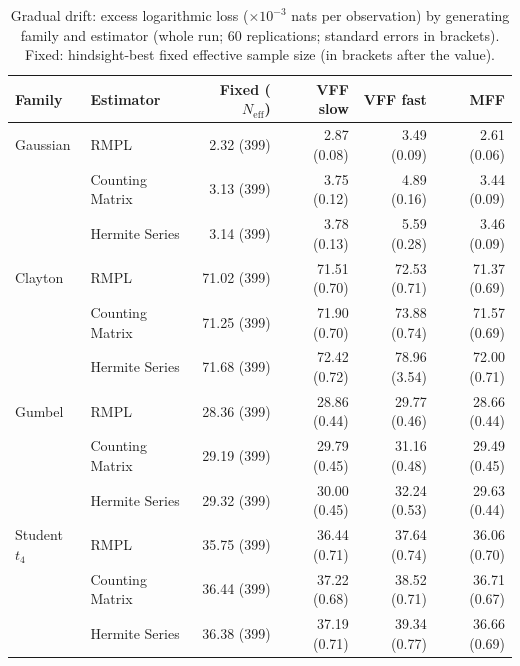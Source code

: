 \begin{table}[htbp]
\centering
\small
\caption{Gradual drift: excess logarithmic loss ($\times10^{-3}$ nats per observation) by generating family and estimator (whole run; 60 replications; standard errors in brackets). Fixed: hindsight-best fixed effective sample size (in brackets after the value).}
\label{tab:app-strategy-excess-drift}
\begin{tabular}{llrrrr}
\toprule
Family & Estimator & Fixed ($N_{\mathrm{eff}}$) & VFF slow & VFF fast & MFF \\
\midrule
Gaussian & RMPL & 2.32 (399) & 2.87 (0.08) & 3.49 (0.09) & 2.61 (0.06) \\
 & Counting Matrix & 3.13 (399) & 3.75 (0.12) & 4.89 (0.16) & 3.44 (0.09) \\
 & Hermite Series & 3.14 (399) & 3.78 (0.13) & 5.59 (0.28) & 3.46 (0.09) \\
\addlinespace
Clayton & RMPL & 71.02 (399) & 71.51 (0.70) & 72.53 (0.71) & 71.37 (0.69) \\
 & Counting Matrix & 71.25 (399) & 71.90 (0.70) & 73.88 (0.74) & 71.57 (0.69) \\
 & Hermite Series & 71.68 (399) & 72.42 (0.72) & 78.96 (3.54) & 72.00 (0.71) \\
\addlinespace
Gumbel & RMPL & 28.36 (399) & 28.86 (0.44) & 29.77 (0.46) & 28.66 (0.44) \\
 & Counting Matrix & 29.19 (399) & 29.79 (0.45) & 31.16 (0.48) & 29.49 (0.45) \\
 & Hermite Series & 29.32 (399) & 30.00 (0.45) & 32.24 (0.53) & 29.63 (0.44) \\
\addlinespace
Student $t_4$ & RMPL & 35.75 (399) & 36.44 (0.71) & 37.64 (0.74) & 36.06 (0.70) \\
 & Counting Matrix & 36.44 (399) & 37.22 (0.68) & 38.52 (0.71) & 36.71 (0.67) \\
 & Hermite Series & 36.38 (399) & 37.19 (0.71) & 39.34 (0.77) & 36.66 (0.69) \\
\bottomrule
\end{tabular}
\end{table}


